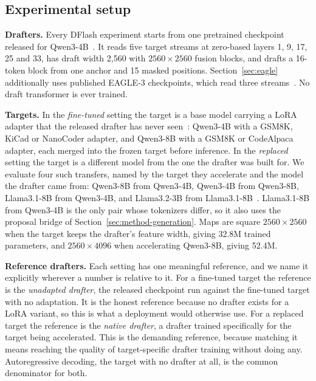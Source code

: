 \subsection{Experimental setup}
\label{sec:setup}

\textbf{Drafters.} Every DFlash experiment starts from one pretrained checkpoint released for Qwen3-4B~\citep{chen2026dflash,yang2025qwen3}. It reads five target streams at zero-based layers 1, 9, 17, 25 and 33, has draft width 2{,}560 with $2560\times2560$ fusion blocks, and drafts a 16-token block from one anchor and 15 masked positions. Section~\ref{sec:eagle} additionally uses published EAGLE-3 checkpoints, which read three streams~\citep{li2025eagle3}. No draft transformer is ever trained.

\textbf{Targets.} In the \emph{fine-tuned} setting the target is a base model carrying a LoRA adapter that the released drafter has never seen~\citep{hu2022lora}: Qwen3-4B with a GSM8K, KiCad or NanoCoder adapter, and Qwen3-8B with a GSM8K or CodeAlpaca~\citep{chaudhary2023codealpaca} adapter, each merged into the frozen target before inference. In the \emph{replaced} setting the target is a different model from the one the drafter was built for. We evaluate four such transfers, named by the target they accelerate and the model the drafter came from: Qwen3-8B from Qwen3-4B, Qwen3-4B from Qwen3-8B, Llama3.1-8B from Qwen3-4B, and Llama3.2-3B from Llama3.1-8B~\citep{grattafiori2024llama3}. Llama3.1-8B from Qwen3-4B is the only pair whose tokenizers differ, so it also uses the proposal bridge of Section~\ref{sec:method-generation}. Maps are square $2560\times2560$ when the target keeps the drafter's feature width, giving 32.8M trained parameters, and $2560\times4096$ when accelerating Qwen3-8B, giving 52.4M.

\textbf{Reference drafters.} Each setting has one meaningful reference, and we name it explicitly wherever a number is relative to it. For a fine-tuned target the reference is the \emph{unadapted drafter}, the released checkpoint run against the fine-tuned target with no adaptation. It is the honest reference because no drafter exists for a LoRA variant, so this is what a deployment would otherwise use. For a replaced target the reference is the \emph{native drafter}, a drafter trained specifically for the target being accelerated. This is the demanding reference, because matching it means reaching the quality of target-specific drafter training without doing any. Autoregressive decoding, the target with no drafter at all, is the common denominator for both.

